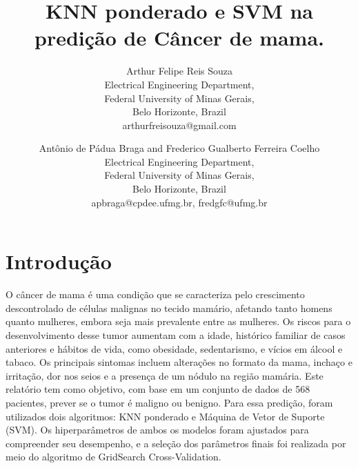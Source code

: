 \documentclass{article} %
\begin{document}
   \title{KNN ponderado e SVM na predição de Câncer de mama.\\
   }

   \author{Arthur Felipe Reis Souza \\
   Electrical Engineering Department, \\
   Federal University of Minas Gerais, \\
   Belo Horizonte, Brazil \\
   arthurfreisouza@gmail.com \\
   \and
   Antônio de Pádua Braga and Frederico Gualberto Ferreira Coelho \\
   Electrical Engineering Department, \\
   Federal University of Minas Gerais, \\
   Belo Horizonte, Brazil \\
   apbraga@cpdee.ufmg.br, fredgfc@ufmg.br
   }

   \maketitle

   \begin{abstract}
   \end{abstract}

   \section{Introdução}

   O câncer de mama é uma condição que se caracteriza pelo crescimento descontrolado de células malignas no tecido mamário, afetando tanto homens quanto mulheres, embora seja mais prevalente entre as mulheres. Os riscos para o desenvolvimento desse tumor aumentam com a idade, histórico familiar de casos anteriores e hábitos de vida, como obesidade, sedentarismo, e vícios em álcool e tabaco. Os principais sintomas incluem alterações no formato da mama, inchaço e irritação, dor nos seios e a presença de um nódulo na região mamária. Este relatório tem como objetivo, com base em um conjunto de dados de 568 pacientes, prever se o tumor é maligno ou benigno. Para essa predição, foram utilizados dois algoritmos: KNN ponderado e Máquina de Vetor de Suporte (SVM). Os hiperparâmetros de ambos os modelos foram ajustados para compreender seu desempenho, e a seleção dos parâmetros finais foi realizada por meio do algoritmo de GridSearch Cross-Validation.

   \vspace{1cm}
\end{document}
